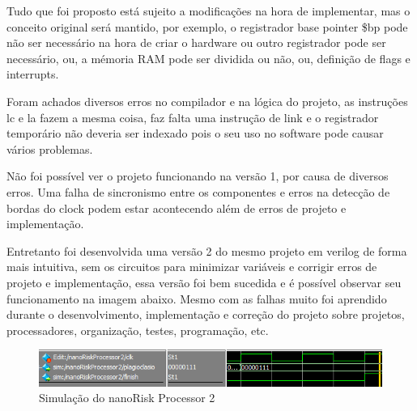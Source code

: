 \documentclass[a4paper, 10pt]{article}
\begin{document}
Tudo que foi proposto está sujeito a modificações na hora de implementar, mas o conceito original será mantido, por exemplo, o registrador base pointer \$bp pode não ser necessário na hora de criar o hardware ou outro registrador pode ser necessário, ou,  a mémoria RAM pode ser dividida ou não, ou, definição de flags e interrupts. 

Foram achados diversos erros no compilador e na lógica do projeto, as instruções lc e la fazem a mesma coisa, faz falta uma instrução de link e o registrador temporário não deveria ser indexado pois o seu uso no software pode causar vários problemas.

Não foi possível ver o projeto funcionando na versão 1, por causa de diversos erros. Uma falha de sincronismo entre os componentes e erros na detecção de bordas do clock podem estar acontecendo além de erros de projeto e implementação.

Entretanto foi desenvolvida uma versão 2 do mesmo projeto em verilog de forma mais intuitiva, sem os circuitos para minimizar variáveis e corrigir erros de projeto e implementação, essa versão foi bem sucedida e é possível observar seu funcionamento na imagem abaixo. Mesmo com as falhas muito foi aprendido durante o desenvolvimento, implementação e correção do projeto sobre projetos, processadores, organização, testes, programação, etc.

\begin{figure}[H]
	\centering
	\includegraphics[scale=0.7]{Working.PNG}
	\caption{Simulação do nanoRisk Processor 2}
	\label{Rotulo}
\end{figure}
\end{document}
